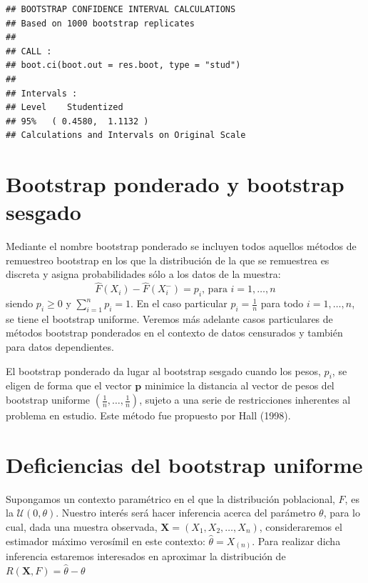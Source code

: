 \documentclass[]{book}
\theoremstyle{definition}
\theoremstyle{definition}
\theoremstyle{definition}
\theoremstyle{remark}
\begin{document}
\begin{verbatim}
## BOOTSTRAP CONFIDENCE INTERVAL CALCULATIONS
## Based on 1000 bootstrap replicates
## 
## CALL : 
## boot.ci(boot.out = res.boot, type = "stud")
## 
## Intervals : 
## Level    Studentized     
## 95%   ( 0.4580,  1.1132 )  
## Calculations and Intervals on Original Scale
\end{verbatim}

\section{Bootstrap ponderado y bootstrap
sesgado}\label{bootstrap-ponderado-y-bootstrap-sesgado}

Mediante el nombre bootstrap ponderado se incluyen todos aquellos
métodos de remuestreo bootstrap en los que la distribución de la que se
remuestrea es discreta y asigna probabilidades sólo a los datos de la
muestra:
\[\hat{F}\left( X_i \right) -\hat{F}\left( X_i^{-} \right) = p_i
\text{, para }i=1,\ldots, n\] siendo \(p_i\geq 0\) y
\(\sum_{i=1}^{n}p_i=1\). En el caso particular \(p_i= \frac{1}{n}\) para
todo \(i=1,\ldots ,n\), se tiene el bootstrap uniforme. Veremos más
adelante casos particulares de métodos bootstrap ponderados en el
contexto de datos censurados y también para datos dependientes.

El bootstrap ponderado da lugar al bootstrap sesgado cuando los pesos,
\(p_i\), se eligen de forma que el vector \(\mathbf{p}\) minimice la
distancia al vector de pesos del bootstrap uniforme
\(\left( \frac{1}{n},\ldots ,\frac{1}{n} \right)\), sujeto a una serie
de restricciones inherentes al problema en estudio. Este método fue
propuesto por Hall (1998).

\section{Deficiencias del bootstrap
uniforme}\label{deficiencias-del-bootstrap-uniforme}

Supongamos un contexto paramétrico en el que la distribución
poblacional, \(F\), es la \(\mathcal{U}\left( 0,\theta \right)\).
Nuestro interés será hacer inferencia acerca del parámetro \(\theta\),
para lo cual, dada una muestra observada,
\(\mathbf{X}=\left( X_1,X_2,\ldots ,X_n \right)\), consideraremos el
estimador máximo verosímil en este contexto: \(\hat{\theta}=X_{(n)}\).
Para realizar dicha inferencia estaremos interesados en aproximar la
distribución de \(R\left( \mathbf{X},F \right) =\hat{\theta}-\theta\)
\end{document}
